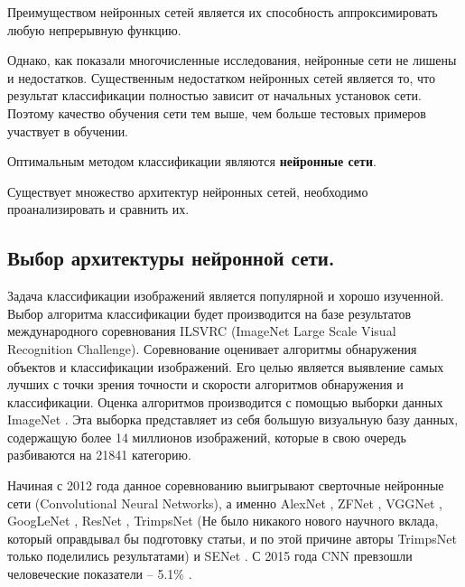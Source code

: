 Преимуществом нейронных сетей является их способность аппроксимировать любую непрерывную функцию. 

Однако, как показали многочисленные исследования, нейронные сети не лишены и недостатков. Существенным недостатком нейронных сетей является то, что результат классификации полностью зависит от начальных установок сети. Поэтому качество обучения сети тем выше, чем больше тестовых примеров участвует в обучении. 

Оптимальным методом классификации являются \textbf{нейронные сети}. 

Существует множество архитектур нейронных сетей, необходимо проанализировать и сравнить их.

\subsection{Выбор архитектуры нейронной сети.}

Задача классификации изображений является популярной и хорошо изученной. Выбор алгоритма классификации будет производится на базе результатов международного соревнования ILSVRC \cite{ILSVRC} (ImageNet Large Scale Visual Recognition Challenge). Соревнование оценивает алгоритмы обнаружения объектов и классификации изображений. Его целью является выявление самых лучших с точки зрения точности и скорости алгоритмов обнаружения и классификации. Оценка алгоритмов производится с помощью выборки данных ImageNet \cite{imagenet}. Эта выборка представляет из себя большую визуальную базу данных, содержащую более 14 миллионов изображений, которые в свою очередь разбиваются на 21841 категорию.

Начиная с 2012 года данное соревнованию выигрывают сверточные нейронные сети (Convolutional Neural Networks), а именно AlexNet \cite{alexnet}, ZFNet \cite{zfnet}, VGGNet \cite{vggnet}, GoogLeNet \cite{googlenet}, ResNet \cite{resnet}, TrimpsNet (Не было никакого нового научного вклада, который оправдывал бы подготовку статьи, и по этой причине авторы TrimpsNet только поделились результатами) и SENet \cite{senet}. С 2015 года CNN превзошли человеческие показатели -- 5.1\% \cite{human}. 

